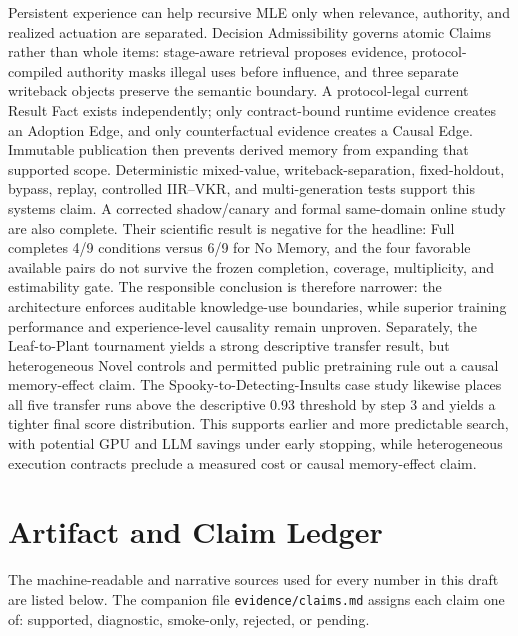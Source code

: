 \documentclass{article}
\newcommand{\ours}{Decision Admissibility}
\begin{document}
Persistent experience can help recursive MLE only when relevance, authority,
and realized actuation are separated.  \ours{} governs atomic Claims rather than
whole items: stage-aware retrieval proposes evidence, protocol-compiled
authority masks illegal uses before influence, and three separate writeback
objects preserve the semantic boundary.  A protocol-legal current Result Fact
exists independently; only contract-bound runtime evidence creates an Adoption
Edge, and only counterfactual evidence creates a Causal Edge.  Immutable
publication then prevents derived memory from expanding that supported scope.
Deterministic mixed-value, writeback-separation, fixed-holdout, bypass,
replay, controlled IIR--VKR, and multi-generation tests support this systems
claim.  A corrected shadow/canary and formal same-domain online study are also
complete.  Their scientific result is negative for the headline: Full completes
4/9 conditions versus 6/9 for No Memory, and the four favorable available pairs
do not survive the frozen completion, coverage, multiplicity, and estimability
gate.  The responsible conclusion is therefore narrower: the architecture
enforces auditable knowledge-use boundaries, while superior training
performance and experience-level causality remain unproven.
Separately, the Leaf-to-Plant tournament yields a strong descriptive transfer
result, but heterogeneous Novel controls and permitted public pretraining rule
out a causal memory-effect claim.
The Spooky-to-Detecting-Insults case study likewise places all five transfer
runs above the descriptive 0.93 threshold by step 3 and yields a tighter final
score distribution.  This supports earlier and more predictable search, with
potential GPU and LLM savings under early stopping, while heterogeneous
execution contracts preclude a measured cost or causal memory-effect claim.




\appendix

\section{Artifact and Claim Ledger}

The machine-readable and narrative sources used for every number in this draft
are listed below.  The companion file \texttt{evidence/claims.md} assigns each
claim one of: supported, diagnostic, smoke-only, rejected, or pending.
\end{document}
